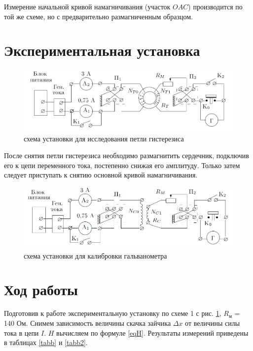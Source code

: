 \documentclass[a4paper,14pt]{article}
\begin{document}
Измерение начальной кривой намагничивания (участок $OAC$) производится по той же схеме, но с предварительно размагниченным образцом. 

\section*{Экспериментальная установка}

\begin{center}
\begin{figure}[bhtp]
	\centering
	\includegraphics[width=\linewidth]{scheme1.png}
	\caption{схема установки для исследования петли гистерезиса}
	\label{scheme1}
\end{figure}
\end{center}

После снятия петли гистерезиса необходимо размагнитить сердечник, подключив его к цепи переменного тока, постепенно снижая его амплитуду. Только затем следует приступать к снятию основной кривой намагничивания.

\begin{center}
\begin{figure}[bhtp]
\centering
\includegraphics[width=\linewidth]{scheme2.png}
\caption{схема установки для калибровки гальванометра}
\label{scheme2}
\end{figure}
\end{center}


\section*{Ход работы}
Подготовив к работе экспериментальную установку по схеме 1 с рис. \ref{scheme1}, $R_\text{м}$ = 140 Ом. Снимем зависимость величины скачка зайчика $\Delta x$ от величины силы тока в цепи $I$. $H$ вычисляем по формуле \eqref{eqH}. Результаты измерений приведены в таблицах \ref{tabb} и \ref{tabb2}.
\end{document}
